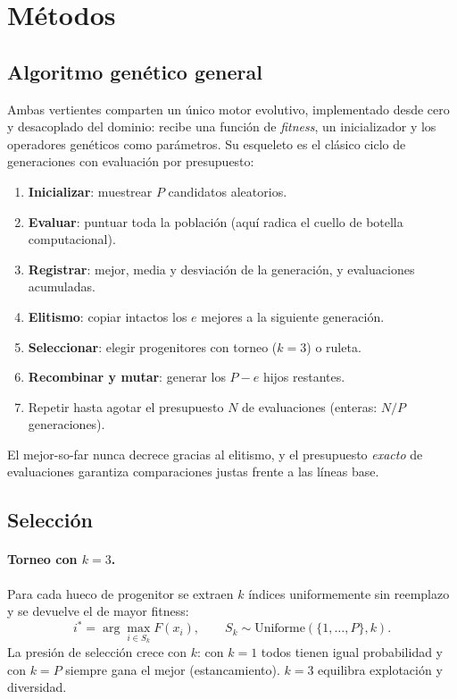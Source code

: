 \section{Métodos}
\label{sec:metodos}

\subsection{Algoritmo genético general}

Ambas vertientes comparten un único motor evolutivo, implementado desde cero y desacoplado del dominio: recibe una función de \emph{fitness}, un inicializador y los operadores genéticos como parámetros. Su esqueleto es el clásico ciclo de generaciones con evaluación por presupuesto:

\begin{enumerate}
  \item \textbf{Inicializar}: muestrear $P$ candidatos aleatorios.
  \item \textbf{Evaluar}: puntuar toda la población (aquí radica el cuello de botella computacional).
  \item \textbf{Registrar}: mejor, media y desviación de la generación, y evaluaciones acumuladas.
  \item \textbf{Elitismo}: copiar intactos los $e$ mejores a la siguiente generación.
  \item \textbf{Seleccionar}: elegir progenitores con torneo ($k=3$) o ruleta.
  \item \textbf{Recombinar y mutar}: generar los $P-e$ hijos restantes.
  \item Repetir hasta agotar el presupuesto $N$ de evaluaciones (enteras: $N/P$ generaciones).
\end{enumerate}

El mejor-so-far nunca decrece gracias al elitismo, y el presupuesto \emph{exacto} de evaluaciones garantiza comparaciones justas frente a las líneas base.

\subsection{Selección}

\paragraph{Torneo con $k=3$.}
Para cada hueco de progenitor se extraen $k$ índices uniformemente sin reemplazo y se devuelve el de mayor fitness:
\begin{equation}
  i^* = \arg\max_{i \in S_k} F(x_i), \qquad S_k \sim \text{Uniforme}(\{1,\dots,P\}, k).
\end{equation}
La presión de selección crece con $k$: con $k=1$ todos tienen igual probabilidad y con $k=P$ siempre gana el mejor (estancamiento). $k=3$ equilibra explotación y diversidad.

